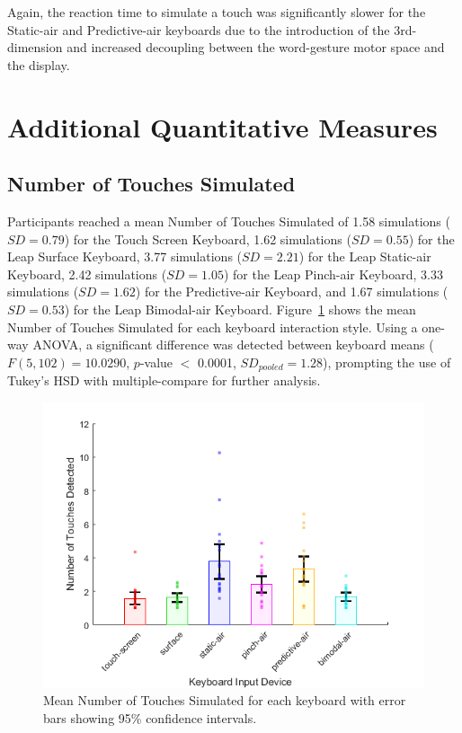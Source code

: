 Again, the reaction time to simulate a touch was significantly slower for the Static-air and Predictive-air keyboards due to the introduction of the 3rd-dimension and increased decoupling between the word-gesture motor space and the display.

\section{Additional Quantitative Measures}

\subsection{Number of Touches Simulated}
Participants reached a mean Number of Touches Simulated of 1.58 simulations ($SD = 0.79$) for the Touch Screen Keyboard, 1.62 simulations ($SD = 0.55$) for the Leap Surface Keyboard, 3.77 simulations ($SD = 2.21$) for the Leap Static-air Keyboard, 2.42 simulations ($SD = 1.05$) for the Leap Pinch-air Keyboard, 3.33 simulations ($SD = 1.62$) for the Predictive-air Keyboard, and 1.67 simulations ($SD = 0.53$) for the Leap Bimodal-air Keyboard. Figure~\ref{fig_num_touches_mean} shows the mean Number of Touches Simulated for each keyboard interaction style. Using a one-way ANOVA, a significant difference was detected between keyboard means ($F(5, 102) = 10.0290$, $p$-value $<$ 0.0001, $SD_{pooled} = 1.28$), prompting the use of Tukey's HSD with multiple-compare for further analysis.

\begin{figure}[!t]
	\centering
	\includegraphics{Figures/fig_num_touches_mean}
	\caption[Mean Number of Touches Simulated]{Mean Number of Touches Simulated for each keyboard with error bars showing 95\% confidence intervals.}
	\label{fig_num_touches_mean}
\end{figure}

